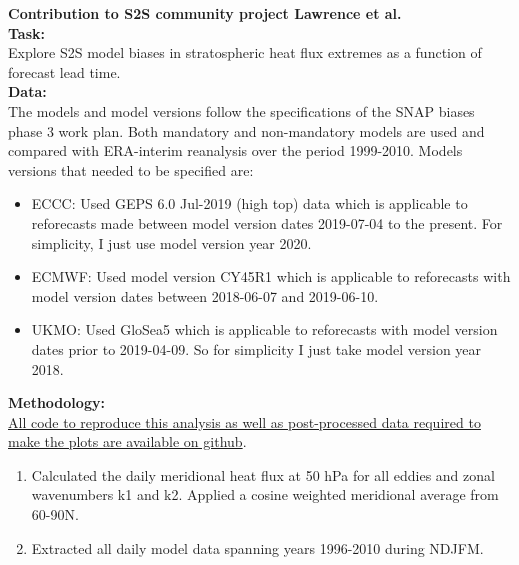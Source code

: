 \documentclass[12pt]{article}
\begin{document}
\begin{spacing}{1}


{\Large {\bf Contribution to S2S community project Lawrence et al. }} \\

{\bf Task:} \\

 Explore S2S model biases in stratospheric heat flux extremes as a function of forecast lead time. \\

{\bf Data:}\\ 

The models and model versions follow the specifications of the SNAP biases phase 3 work plan. Both mandatory and non-mandatory models are used and compared with ERA-interim reanalysis over the period 1999-2010. Models versions that needed to be specified are: 

\begin{itemize}

\item ECCC:  Used GEPS 6.0 Jul-2019 (high top) data which is applicable to reforecasts made between model version dates 2019-07-04 to the present. For simplicity, I just use model version year 2020.

\item ECMWF: Used model version CY45R1 which is applicable to reforecasts with model version dates between 2018-06-07 and 2019-06-10.

\item UKMO: Used GloSea5 which is applicable to reforecasts with model version dates prior to 2019-04-09. So for simplicity I just take model version year 2018.


\end{itemize}


{\bf Methodology:} \\

\href{https://github.com/edunnsigouin/l21}{All code to reproduce this analysis as well as post-processed data required to make the plots are available on github}. 

\begin{enumerate}

\item Calculated the daily meridional heat flux at 50 hPa for all eddies and zonal wavenumbers k1 and k2. Applied a cosine weighted meridional average from 60-90N.

\item Extracted all daily model data spanning years 1996-2010 during NDJFM. 


\end{enumerate}
\end{spacing}
\end{document}
